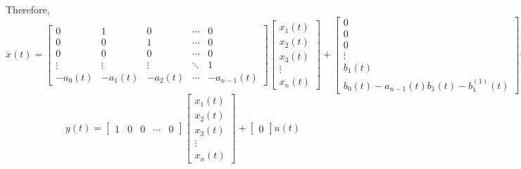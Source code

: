 Therefore,
\[
    \boxed{
        \dot{x}(t)
        =
        \begin{bmatrix}
            0       & 1       & 0       & \cdots & 0           \\
            0       & 0       & 1       & \cdots & 0           \\
            0       & 0       & 0       & \cdots & 0           \\
            \vdots  & \vdots  & \vdots  & \ddots & 1           \\
            -a_0(t) & -a_1(t) & -a_2(t) & \cdots & -a_{n-1}(t)
        \end{bmatrix}
        \begin{bmatrix}
            x_1(t) \\
            x_2(t) \\
            x_3(t) \\
            \vdots \\
            x_n(t)
        \end{bmatrix}
        +
        \begin{bmatrix}
            0      \\
            0      \\
            0      \\
            \vdots \\
            b_1(t) \\
            b_0(t) - a_{n-1}(t)b_1(t) - b_1^{(1)}(t)
        \end{bmatrix}
        u(t)
    }
\]
\[
    \boxed{
        y(t)
        =
        \begin{bmatrix}
            1 & 0 & 0 & \cdots & 0
        \end{bmatrix}
        \begin{bmatrix}
            x_1(t) \\
            x_2(t) \\
            x_3(t) \\
            \vdots \\
            x_n(t)
        \end{bmatrix}
        +
        \begin{bmatrix}
            0
        \end{bmatrix}
        u(t)
    }
\]
